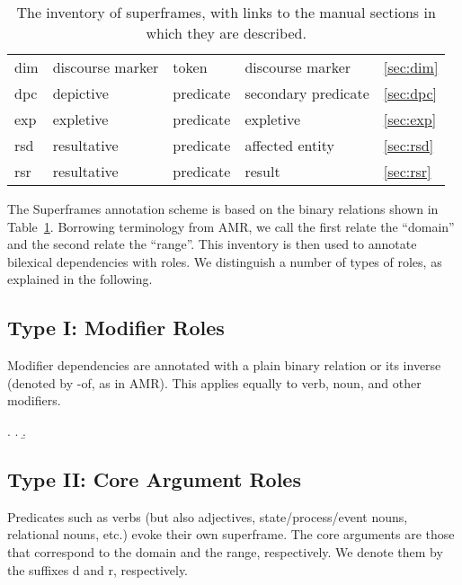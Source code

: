 \documentclass[a4paper]{article}
\begin{document}
\begin{table}
\begin{tabular}{lllll}
        dim & discourse marker & token & discourse marker & \ref{sec:dim} \\
        dpc & depictive & predicate & secondary predicate & \ref{sec:dpc}\\
        exp & expletive & predicate & expletive & \ref{sec:exp} \\
        rsd & resultative & predicate & affected entity & \ref{sec:rsd} \\
        rsr & resultative & predicate & result & \ref{sec:rsr} \\
        \bottomrule
    \end{tabular}
    \caption{The inventory of superframes, with links to the manual sections in which they are described.}
    \label{tab:inventory}
\end{table}

The Superframes annotation scheme is based on the binary relations shown in Table~\ref{tab:inventory}. Borrowing terminology from AMR, we call the first relate the ``domain'' and the second relate the ``range''. This inventory is then used to annotate bilexical dependencies with roles. We distinguish a number of types of roles, as explained in the following.


\subsection{Type I: Modifier Roles}

Modifier dependencies are annotated with a plain binary relation or its inverse (denoted by \textsf{-of}, as in AMR). This applies equally to verb, noun, and other modifiers.

\ex. \a. 
     \b. 


\subsection{Type II: Core Argument Roles}

Predicates such as verbs (but also adjectives, state/process/event nouns, relational nouns, etc.) evoke their own superframe. The core arguments are those that correspond to the domain and the range, respectively. We denote them by the suffixes \textsf{d} and \textsf{r}, respectively.
\end{document}
